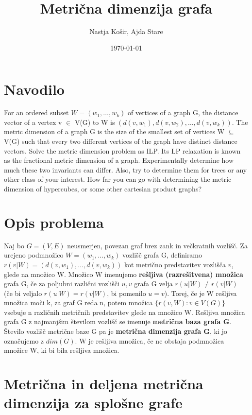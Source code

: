 \documentclass[a4paper]{report}
\title{Metrična dimenzija grafa }
\author{Nastja Košir, Ajda Stare}
\date{\today}
\begin{document}
	\maketitle

\section*{Navodilo}
For an ordered subset $W = (w_1 , \dots, w_k ) $ of vertices of a graph G, the distance vector of a vertex v $\in$ V(G)  to  W  is  $(d(v, w_1 ), d(v, w_2 ), \dots, d(v, w_k))$. The metric dimension of a graph G is the size of the smallest set of vertices W  $\subseteq $ V(G) such that every two different vertices of the graph have distinct distance vectors. Solve the metric dimension problem as ILP. Its LP relaxation is known as the fractional metric dimension of a graph. Experimentally determine how much these two invariants can differ. Also, try to determine them for trees or any other class of your interest. How far you can go with determining the metric dimension of hypercubes, or some other cartesian product graphs?\\

\section*{Opis problema}
Naj bo $G=(V,E)$ neusmerjen, povezan graf brez zank in večkratnih vozlišč. Za urejeno podmnožico $ W =(w_1 , \dots, w_k )$ vozlišč grafa G, definiramo\\$r(v|W) = (d(v,w_1), \dots ,   d(v,w_k))$ kot  metrično predstavitev vozlišča $v$, glede na množico W. Množico W imenujemo \textbf{rešljiva (razrešitvena) množica} grafa G, če za poljubni  različni vozlišči $u,v$ grafa G velja $r(u|W)\neq r(v|W)$ (če bi veljalo $r(u|W)= r(v|W)$, bi pomenilo $u = v$). Torej, če je W rešljiva množica moči k, za graf G reda n, potem množica $\{r(v,W): v\in V(G)\}$ vsebuje n različnih metričnih predstavitev glede na množico W. Rešljiva množica grafa G z najmanjšim številom vozlišč se imenuje \textbf{metrična baza grafa G}. Število vozlišč metrične baze G pa je \textbf{metrična dimenzija grafa G}, ki jo označujemo z \textbf{$dim(G)$}. W je rešljiva množica, če ne obstaja podmnožica množice W, ki bi bila rešljiva množica.  

\section*{Metrična in deljena metrična dimenzija za splošne grafe}
\end{document}
